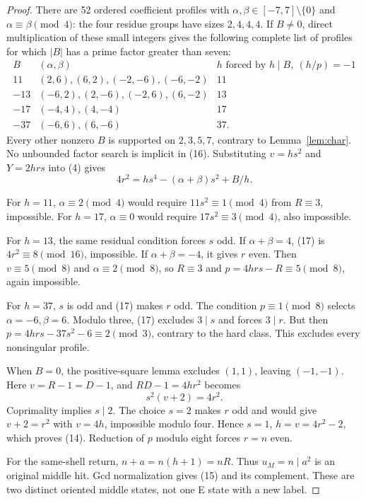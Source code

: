 \begin{proof}
There are 52 ordered coefficient profiles with $\alpha,\beta\in[-7,7]\setminus\{0\}$
and $\alpha\equiv\beta\pmod4$: the four residue groups have sizes $2,4,4,4$.
If $B\ne0$, direct multiplication of these small integers gives the following
complete list of profiles for which $|B|$ has a prime factor greater than seven:
\[
\begin{array}{c|c|c}
 B& (\alpha,\beta)&h\text{ forced by }h\mid B,\ (h/p)=-1\\ \hline
 11&(2,6),(6,2),(-2,-6),(-6,-2)&11\\
 -13&(-6,2),(2,-6),(-2,6),(6,-2)&13\\
 -17&(-4,4),(4,-4)&17\\
 -37&(-6,6),(6,-6)&37.
\end{array}                                             \tag{16}
\]
Every other nonzero $B$ is supported on $2,3,5,7$, contrary to
Lemma~\ref{lem:char}. No unbounded factor search is implicit in (16).
Substituting $v=hs^2$ and $Y=2hrs$ into (4) gives
\[
 \boxed{4r^2=hs^4-(\alpha+\beta)s^2+B/h.}                \tag{17}
\]

For $h=11$, $\alpha\equiv2\pmod4$ would require $11s^2\equiv1\pmod4$ from
$R\equiv3$, impossible. For $h=17$, $\alpha\equiv0$ would require
$17s^2\equiv3\pmod4$, also impossible.

For $h=13$, the same residual condition forces $s$ odd. If $\alpha+\beta=4$,
(17) is $4r^2\equiv8\pmod{16}$, impossible. If $\alpha+\beta=-4$, it gives
$r$ even. Then $v\equiv5\pmod8$ and $\alpha\equiv2\pmod8$, so $R\equiv3$
and $p=4hrs-R\equiv5\pmod8$, again impossible.

For $h=37$, $s$ is odd and (17) makes $r$ odd. The condition $p\equiv1\pmod8$
selects $\alpha=-6,\beta=6$. Modulo three, (17) excludes $3\mid s$ and forces
$3\mid r$. But then $p=4hrs-37s^2-6\equiv2\pmod3$, contrary to the hard class.
This excludes every nonsingular profile.

When $B=0$, the positive-square lemma excludes $(1,1)$, leaving $(-1,-1)$.
Here $v=R-1=D-1$, and $RD-1=4hr^2$ becomes
\[
 s^2(v+2)=4r^2.
\]
Coprimality implies $s\mid2$. The choice $s=2$ makes $r$ odd and would give
$v+2=r^2$ with $v=4h$, impossible modulo four. Hence $s=1$, $h=v=4r^2-2$,
which proves (14). Reduction of $p$ modulo eight forces $r=n$ even.

For the same-shell return, $n+a=n(h+1)=nR$. Thus $u_M=n\mid a^2$ is an
original middle hit. Gcd normalization gives (15) and its complement. These
are two distinct oriented middle states, not one E state with a new label.
\end{proof}

